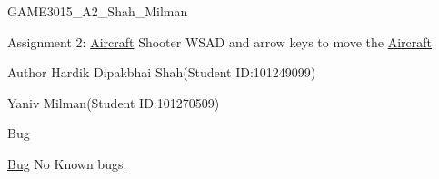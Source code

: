 GAME3015\+\_\+\+A2\+\_\+\+Shah\+\_\+\+Milman

Assignment 2\+: \mbox{\hyperlink{class_aircraft}{Aircraft}} Shooter WSAD and arrow keys to move the \mbox{\hyperlink{class_aircraft}{Aircraft}}

\begin{DoxyAuthor}{Author}
Hardik Dipakbhai Shah(\+Student ID\+:101249099) 

Yaniv Milman(\+Student ID\+:101270509)
\end{DoxyAuthor}
\begin{DoxyRefDesc}{Bug}
\item[\mbox{\hyperlink{bug__bug000001}{Bug}}]No Known bugs. \end{DoxyRefDesc}
